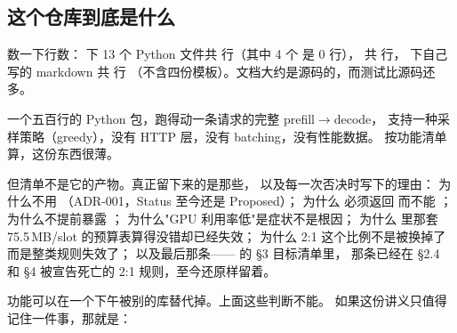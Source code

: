 \subsection*{这个仓库到底是什么}

数一下行数： 下 13 个 Python 文件共  行（其中 4 个 
是 0 行）， 共  行， 下自己写的 markdown 共  行
（不含四份模板）。文档大约是源码的，而测试比源码还多。

一个五百行的 Python 包，跑得动一条请求的完整 prefill$\to$decode，
支持一种采样策略（greedy），没有 HTTP 层，没有 batching，没有性能数据。
按功能清单算，这份东西很薄。

但清单不是它的产物。真正留下来的是那些，
以及每一次否决时写下的理由：
为什么不用 （ADR-001，Status 至今还是 Proposed）；
为什么  必须返回  而不能 ；
为什么不提前暴露 ；
为什么"GPU 利用率低"是症状不是根因；
为什么  里那套 75.5\,MB/slot 的预算表算得没错却已经失效；
为什么 2:1 这个比例不是被换掉了而是整类规则失效了；
以及最后那条—— 的 §3 目标清单里，
那条已经在 §2.4 和 §4 被宣告死亡的 2:1 规则，至今还原样留着。

功能可以在一个下午被别的库替代掉。上面这些判断不能。
如果这份讲义只值得记住一件事，那就是：
